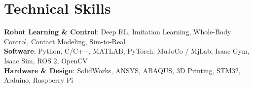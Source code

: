 \documentclass[letterpaper,11pt]{article}
\begin{document}
\section{Technical Skills}
 \begin{itemize}[leftmargin=0.15in, label={}]
    \small{\item{
     \textbf{Robot Learning \& Control}{: Deep RL, Imitation Learning, Whole-Body Control, Contact Modeling, Sim-to-Real} \\
     \textbf{Software}{: Python, C/C++, MATLAB, PyTorch, MuJoCo / MjLab, Isaac Gym, Isaac Sim, ROS 2, OpenCV} \\
     \textbf{Hardware \& Design}{: SolidWorks, ANSYS, ABAQUS, 3D Printing, STM32, Arduino, Raspberry Pi}
    }}
 \end{itemize}

\end{document}
